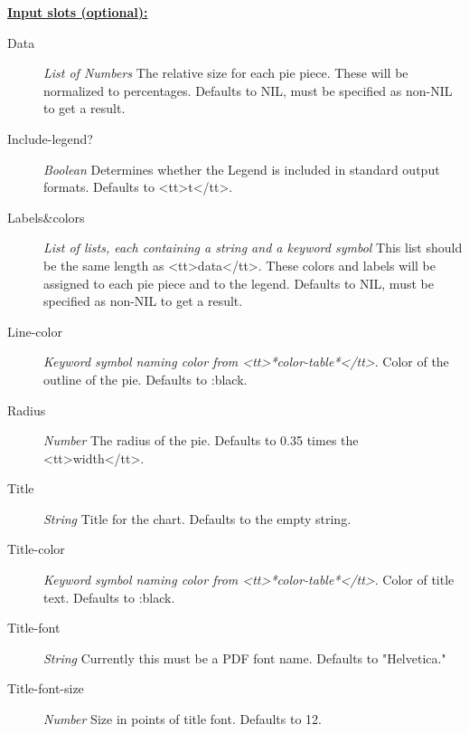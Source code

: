 \documentclass [11pt]{book}
\begin{document}
\begin{itemize}
\textbf{
\underline{Input slots (optional):}}

\begin{description}

\item [Data]
\emph{List of Numbers} The relative size for each pie piece. These will be normalized to percentages.
Defaults to NIL, must be specified as non-NIL to get a result.


\item [Include-legend?]
\emph{Boolean} Determines whether the Legend is included in standard output formats. Defaults to <tt>t</tt>.


\item [Labels&colors]
\emph{List of lists, each containing a string and a keyword symbol} This list should be the same
length as <tt>data</tt>. These colors and labels will be assigned to each pie piece and to the legend.
Defaults to NIL, must be specified as non-NIL to get a result.


\item [Line-color]
\emph{Keyword symbol naming color from <tt>*color-table*</tt>}.
Color of the outline of the pie. Defaults to :black.


\item [Radius]
\emph{Number} The radius of the pie. Defaults to 0.35 times the <tt>width</tt>.


\item [Title]
\emph{String} Title for the chart. Defaults to the empty string.


\item [Title-color]
\emph{Keyword symbol naming color from <tt>*color-table*</tt>}.
Color of title text. Defaults to :black.


\item [Title-font]
\emph{String} Currently this must be a PDF font name. Defaults to "Helvetica."


\item [Title-font-size]
\emph{Number} Size in points of title font. Defaults to 12.


\end{description}








\end{itemize}
\end{document}
